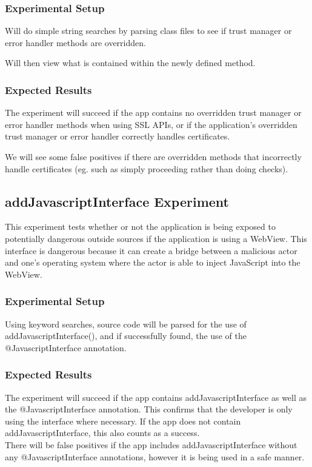 \documentclass[10pt,twocolumn,pdftex]{article}
\begin{document}
    \subsubsection{Experimental Setup}
    Will do simple string searches by parsing class files to see if trust manager or error handler methods are overridden.
    
    Will then view what is contained within the newly defined method. 

    \subsubsection{Expected Results}
    The experiment will succeed if the app contains no overridden trust manager or error handler methods when using SSL APIs, or if the application's overridden trust manager or error handler correctly handles certificates.

    We will see some false positives if there are overridden methods that incorrectly handle certificates (eg. such as simply proceeding rather than doing checks).


\subsection{addJavascriptInterface Experiment}
This experiment tests whether or not the application is being exposed to potentially dangerous outside sources if the application is using a WebView. This interface is dangerous because it can create a bridge between a malicious actor and one's operating system where the actor is able to inject JavaScript into the WebView.

    \subsubsection{Experimental Setup}
        Using keyword searches, source code will be parsed for the use of addJavascriptInterface(), and if successfully found, the use of the @JavascriptInterface annotation.

    \subsubsection{Expected Results}
        The experiment will succeed if the app contains addJavascriptInterface as well as the @JavascriptInterface annotation. This confirms that the developer is only using the interface where necessary. If the app does not contain addJavascriptInterface, this also counts as a success. \\
        There will be false positives if the app includes addJavascriptInterface without any @JavascriptInterface annotations, however it is being used in a safe manner.
\end{document}
